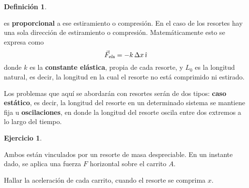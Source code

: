 \documentclass[a4paper,12pt,twoside]{book}
\newtheorem{defn}{{Definición}}[chapter]
\newtheorem{ejercicio}{{Ejercicio}}[chapter]
\begin{document}
\begin{mdframed}[style=definicion-o-propiedad]
    \begin{defn}
    \end{defn}
     es \textbf{proporcional} a ese estiramiento o compresión.
    En el caso de los resortes hay una sola dirección de estiramiento o compresión.
    Matemáticamente esto se expresa como
    \begin{equation*}
        {{\Vec{F}}_\textsl{{ela}}} = - k \, \Delta x \, \hat{\imath}
    \end{equation*}
    donde $k$ es la \textbf{constante elástica}, propia de cada resorte, y $L_0$ es la longitud natural, es decir, la longitud en la cual el resorte no está comprimido ni estirado.

    Los problemas que aquí se abordarán con resortes serán de dos tipos: \textbf{caso estático}, es decir, la longitud del resorte en un determinado sistema se mantiene fija u \textbf{oscilaciones}, en donde la longitud del resorte oscila entre dos extremos a lo largo del tiempo.
\end{mdframed}

\begin{mdframed}[style=ejercicio-intermedio]
    \begin{ejercicio}
    \end{ejercicio}
    Ambos están vinculados por un resorte de masa despreciable.
    En un instante dado, se aplica una fuerza $F$ horizontal sobre el carrito $A$.
    \begin{center}
        \def\svgwidth{0.6\linewidth}
        
    \end{center}
    Hallar la aceleración de cada carrito, cuando el resorte se comprima $x$.
\end{mdframed}
\end{document}
